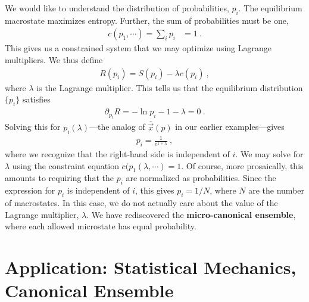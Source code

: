 We would like to understand the distribution of probabilities, $p_i$.
The equilibrium macrostate maximizes entropy. Further, the sum of probabilities must be one, 
\begin{align}
    c(p_1, \cdots) = \sum_i p_i &= 1 \ .
\end{align}
This gives us a constrained system that we may optimize using Lagrange multipliers. We thus define
\begin{align}
    R(p_i) = S(p_i) - \lambda c(p_i) \ ,
\end{align}
where $\lambda$ is the Lagrange multiplier. This tells us that the equilibrium distribution $\{p_i\}$ satisfies
\begin{align}
    \partial_{p_i} R = - \ln p_i - 1 - \lambda = 0 \ .
\end{align}
Solving this for $p_i(\lambda)$---the analog of $\bar{\vec{x}}(p)$ in our earlier examples---gives
\begin{align}
    p_i = \frac{1}{e^{1+\lambda}} \ ,
\end{align}
where we recognize that the right-hand side is independent of $i$. We may solve for $\lambda$ using the constraint equation $c(p_1(\lambda, \cdots) = 1$. Of course, more prosaically, this amounts to requiring that the $p_i$ are normalized as probabilities. Since the expression for $p_i$ is independent of $i$, this gives $p_i = 1/N$, where $N$ are the number of macrostates. In this case, we do not actually care about the value of the Lagrange multiplier, $\lambda$. We have rediscovered the \textbf{micro-canonical ensemble}, where each allowed microstate has equal probability.


\section{Application: Statistical Mechanics, Canonical Ensemble}

